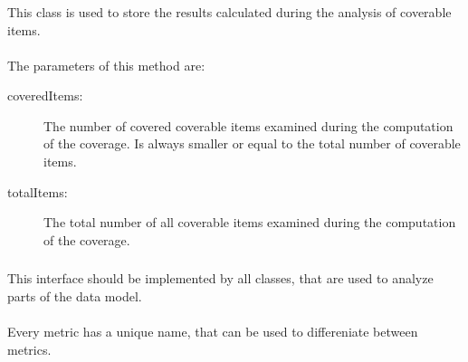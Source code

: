 \subsubsection{} \label{Classes:Metrics:CoverageResult}

This class is used to store the results calculated during the analysis of coverable items.

\paragraph{} \label{Classes:Metrics:CoverageResult:CoverageResult}
The parameters of this method are:
\begin{description}
\item[coveredItems:] The number of covered coverable items examined during the computation of the coverage. Is always smaller or equal to the total number of  coverable items.

\item[totalItems:] The total number of all coverable items examined during the computation of the coverage.

\end{description}

\subsubsection{} \label{Classes:Metrics:Metric}

This interface should be implemented by all classes, that are used to analyze parts of the data model.

\paragraph{} \label{Classes:Metrics:Metric:getName}

Every metric has a unique name, that can be used to differeniate between metrics.

\paragraph{} \label{Classes:Metrics:Metric:getDescription}

